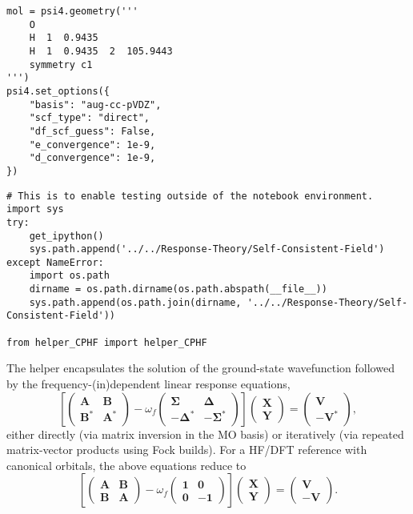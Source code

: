 \begin{verbatim}
mol = psi4.geometry('''
    O
    H  1  0.9435
    H  1  0.9435  2  105.9443
    symmetry c1
''')
psi4.set_options({
    "basis": "aug-cc-pVDZ",
    "scf_type": "direct",
    "df_scf_guess": False,
    "e_convergence": 1e-9,
    "d_convergence": 1e-9,
})
\end{verbatim}
\begin{verbatim}
# This is to enable testing outside of the notebook environment.
import sys
try:
    get_ipython()
    sys.path.append('../../Response-Theory/Self-Consistent-Field')
except NameError:
    import os.path
    dirname = os.path.dirname(os.path.abspath(__file__))
    sys.path.append(os.path.join(dirname, '../../Response-Theory/Self-Consistent-Field'))

from helper_CPHF import helper_CPHF
\end{verbatim}
The helper encapsulates the solution of the ground-state wavefunction followed by the frequency-(in)dependent linear response equations,
\begin{equation}
  \left[
    \begin{pmatrix}
      \mathbf{A} & \mathbf{B} \\
      \mathbf{B}^{*} & \mathbf{A}^{*}
    \end{pmatrix}
    - \omega_{f}
    \begin{pmatrix}
      \mathbf{\Sigma} & \mathbf{\Delta} \\
      -\mathbf{\Delta}^{*} & -\mathbf{\Sigma}^{*}
    \end{pmatrix}
  \right]
  \begin{pmatrix}
    \mathbf{X} \\
    \mathbf{Y}
  \end{pmatrix}
  =
  \begin{pmatrix}
    \mathbf{V} \\
    -\mathbf{V}^{*}
  \end{pmatrix}
  ,
\end{equation}
either directly (via matrix inversion in the MO basis) or iteratively (via repeated matrix-vector products using Fock builds). For a HF/DFT reference with canonical orbitals, the above equations reduce to
\begin{equation}
  \left[
    \begin{pmatrix}
      \mathbf{A} & \mathbf{B} \\
      \mathbf{B} & \mathbf{A}
    \end{pmatrix}
    - \omega_{f}
    \begin{pmatrix}
      \mathbf{1} & \mathbf{0} \\
      \mathbf{0} & -\mathbf{1}
    \end{pmatrix}
  \right]
  \begin{pmatrix}
    \mathbf{X} \\
    \mathbf{Y}
  \end{pmatrix}
  =
  \begin{pmatrix}
    \mathbf{V} \\
    -\mathbf{V}
  \end{pmatrix}
  .
\end{equation}
